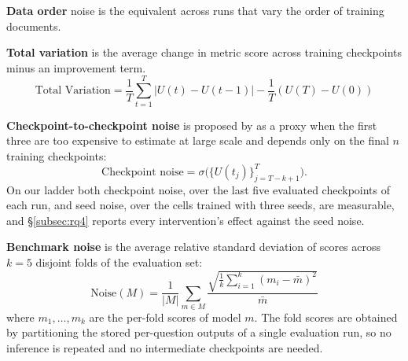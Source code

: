 \textbf{Data order} noise is the equivalent across runs that vary the order of training documents. 

\textbf{Total variation} is the average change in metric score across training checkpoints minus an improvement term.
\label{app:total-variation}
\begin{equation}
\text{Total Variation} = \textstyle\frac{1}{T} \sum_{t=1}^{T} |U(t) - U(t-1)| - \frac{1}{T}(U(T) - U(0))
\end{equation}

\textbf{Checkpoint-to-checkpoint noise} is proposed by \citet{heineman_signal_2025} as a proxy when the first three are too expensive to estimate at large scale and depends only on the final $n$ training checkpoints:
\begin{equation}
\text{Checkpoint noise} = \sigma\big(\{U(t_j)\}_{j=T-k+1}^{T}\big).
\end{equation}
On our ladder both checkpoint noise, over the last five evaluated checkpoints of each run, and seed noise, over the cells trained with three seeds, are measurable, and \S\ref{subsec:rq4} reports every intervention's effect against the seed noise.

\textbf{Benchmark noise} is the average relative standard deviation of scores across $k = 5$ disjoint folds of the evaluation set:
\begin{equation}
\text{Noise}(M) = \frac{1}{|M|} \sum_{m \in M} \frac{\sqrt{\tfrac{1}{k}\sum_{i=1}^{k}(m_i - \bar{m})^2}}{\bar{m}}
\end{equation}
where $m_1, \dots, m_k$ are the per-fold scores of model $m$. 
The fold scores are obtained by partitioning the stored per-question outputs of a single evaluation run, so no inference is repeated and no intermediate checkpoints are needed.

